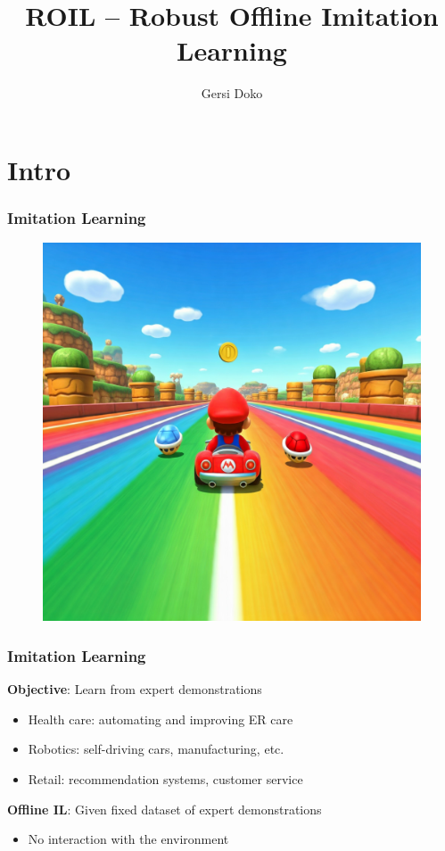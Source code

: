 \documentclass{beamer}
\title{ROIL -- Robust Offline Imitation Learning}
\author{Gersi Doko}
\institute{Department of Computer Science \\ University of New Hampshire}
\date{}
\begin{document}
\frame{\titlepage}

\section*{Intro}

\begin{frame}
	\frametitle{Imitation Learning}
	\centering
	\begin{minipage}{0.9\linewidth}
		\begin{figure}
			\centering
			\includegraphics[width=\linewidth,height=0.8\linewidth]{plots/Gemini_Generated_Image_3qbenb3qbenb3qbe.jpeg}
		\end{figure}
	\end{minipage}
\end{frame}

\begin{frame}
	\frametitle{Imitation Learning}
	\textbf{Objective}: Learn from expert demonstrations
	\begin{itemize}
		\item Health care: automating and improving ER care
		\item Robotics: self-driving cars, manufacturing, etc.
		\item Retail: recommendation systems, customer service
	\end{itemize}
	\vfill
	\textbf{Offline IL}: Given fixed dataset of expert demonstrations
	\begin{itemize}
		\item No interaction with the environment
	\end{itemize}
\end{frame}
\end{document}
